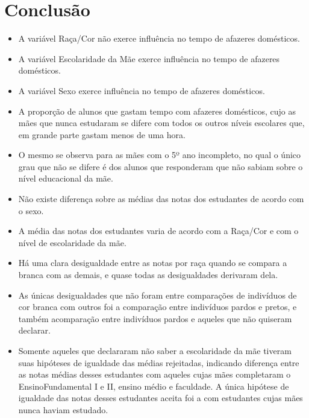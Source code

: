
\chapter{Conclusão}


\begin{itemize}

\item A variável Raça/Cor não exerce influência no tempo de afazeres domésticos.
\item A variável Escolaridade da Mãe exerce influência no tempo de afazeres domésticos.
\item A variável Sexo exerce influência no tempo de afazeres domésticos.
\item A proporção de alunos que gastam tempo com afazeres domésticos, cujo as mães que nunca estudaram se difere com todos os outros níveis escolares que, em grande parte gastam menos de uma hora.
\item O mesmo se observa para as mães com o 5º ano incompleto, no qual o único grau que não se difere é dos alunos que responderam que não sabiam sobre o nível educacional da mãe.
\item Não existe diferença sobre as médias das notas dos estudantes de acordo com o sexo.
\item A média das notas dos estudantes varia de acordo com a Raça/Cor e com o nível de escolaridade da mãe.
\item Há uma clara desigualdade entre as notas por raça quando se compara a branca com as demais, e quase todas as desigualdades derivaram dela.
\item As únicas desigualdades que não foram entre comparações de indivíduos de cor branca com outros foi a comparação entre indivíduos pardos e pretos, e também acomparação entre indivíduos pardos e aqueles que não quiseram declarar.
\item Somente aqueles que declararam não saber a escolaridade da mãe tiveram suas hipóteses de igualdade das médias rejeitadas, indicando diferença entre as notas médias desses estudantes com aqueles cujas mães completaram o EnsinoFundamental I e II, ensino médio e faculdade. A única hipótese de igualdade das notas desses estudantes aceita foi a com estudantes cujas mães nunca haviam estudado.


\end{itemize}